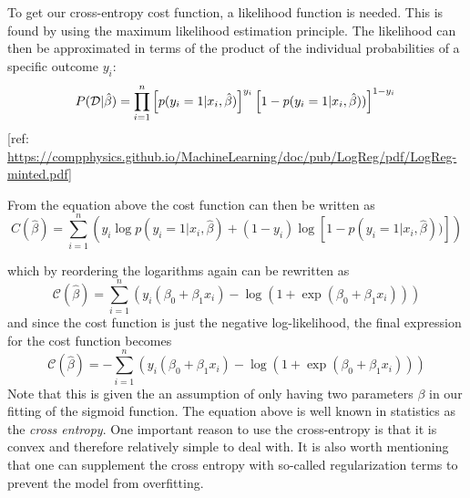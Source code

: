 \documentclass[a4paper,12pt]{article}
\begin{document}
 To get our cross-entropy cost function, a likelihood function is needed. This is found by using the maximum likelihood estimation principle. The likelihood can then be approximated in terms of the product of the individual probabilities of a specific outcome $y_i$:
 \begin{equation}
     P(\mathcal{D}|\hat{\beta}) = \prod_{i=1}^n \left[p(y_i=1|x_i,\hat{\beta})\right]^{y_i}\left[1-p(y_i=1|x_i,\hat{\beta}))\right]^{1-y_i}\nonumber \\
 \end{equation}
 [ref: \href{https://compphysics.github.io/MachineLearning/doc/pub/LogReg/pdf/LogReg-minted.pdf}{https://compphysics.github.io/MachineLearning/doc/pub/LogReg/pdf/LogReg-minted.pdf}]\newline
 
 From the equation above the cost function can then be written as
 \begin{equation}
 C(\hat{\beta}) = \sum_{i=1}^n \left( y_i\log{p(y_i=1|x_i,\hat{\beta})} + (1-y_i)\log\left[1-p(y_i=1|x_i,\hat{\beta}))\right]\right)
 \end{equation}
 
 which by reordering the logarithms again can be rewritten as
 \begin{equation}
     \mathcal{C}(\hat{\beta}) = \sum_{i=1}^n  \left(y_i(\beta_0+\beta_1x_i) -\log{(1+\exp{(\beta_0+\beta_1x_i)})}\right)
 \end{equation}
 and since the cost function is just the negative log-likelihood, the final expression for the cost function becomes
 \begin{equation}
     \mathcal{C}(\hat{\beta}) = -\sum_{i=1}^n  \left(y_i(\beta_0+\beta_1x_i) -\log{(1+\exp{(\beta_0+\beta_1x_i)})}\right)
 \end{equation}
 Note that this is given the an assumption of only having two parameters $\beta$ in our fitting of the sigmoid function.\newline
 The equation above is well known in statistics as the \emph{cross entropy}.\newline
 One important reason to use the cross-entropy is that it is convex and therefore relatively simple to deal with.
It is also worth mentioning that one can supplement the cross entropy with so-called regularization terms to prevent the model from overfitting.\newline
\end{document}
